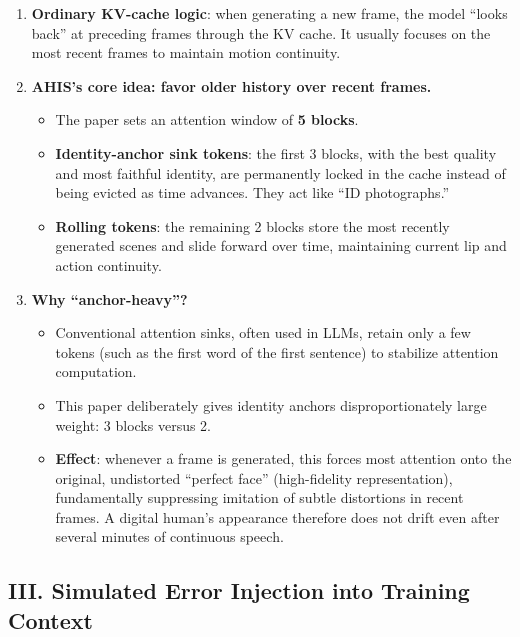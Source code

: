 \begin{enumerate}
\def\labelenumi{\arabic{enumi}.}
\item
  \textbf{Ordinary KV-cache logic}: when generating a new frame, the model ``looks back'' at preceding frames through the KV cache. It usually focuses on the most recent frames to maintain motion continuity.
\item
  \textbf{AHIS's core idea: favor older history over recent frames.}

  \begin{itemize}
  \tightlist
  \item
    The paper sets an attention window of \textbf{5 blocks}.
  \item
    \textbf{Identity-anchor sink tokens}: the first 3 blocks, with the best quality and most faithful identity, are permanently locked in the cache instead of being evicted as time advances. They act like ``ID photographs.''
  \item
    \textbf{Rolling tokens}: the remaining 2 blocks store the most recently generated scenes and slide forward over time, maintaining current lip and action continuity.
  \end{itemize}
\item
  \textbf{Why ``anchor-heavy''?}

  \begin{itemize}
  \tightlist
  \item
    Conventional attention sinks, often used in LLMs, retain only a few tokens (such as the first word of the first sentence) to stabilize attention computation.
  \item
    This paper deliberately gives identity anchors disproportionately large weight: 3 blocks versus 2.
  \item
    \textbf{Effect}: whenever a frame is generated, this forces most attention onto the original, undistorted ``perfect face'' (high-fidelity representation), fundamentally suppressing imitation of subtle distortions in recent frames. A digital human's appearance therefore does not drift even after several minutes of continuous speech.
  \end{itemize}
\end{enumerate}

\hypertarget{iii.-simulated-error-injection-into-training-context}{%
\subsection{III. Simulated Error Injection into Training Context}\label{iii.-simulated-error-injection-into-training-context}}

